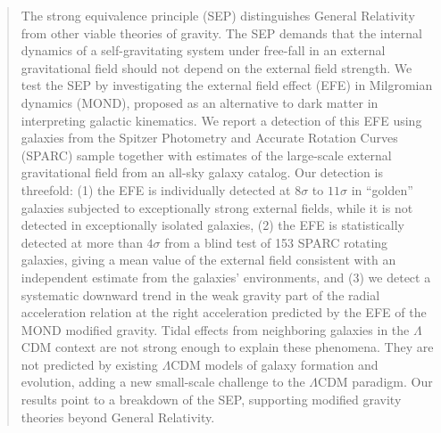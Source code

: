 \documentclass[twocolumn,tighten]{aastex63}
\begin{document}
\begin{abstract}
  The strong equivalence principle (SEP) distinguishes General Relativity from other viable theories of gravity. The SEP demands that the internal dynamics of a self-gravitating system under free-fall in an external gravitational field should not depend on the external field strength. We test the SEP by investigating the external field effect (EFE) in Milgromian dynamics (MOND), proposed as an alternative to dark matter in interpreting galactic kinematics. We report a detection of this EFE using galaxies from the Spitzer Photometry and Accurate Rotation Curves (SPARC) sample together with estimates of the large-scale external gravitational field from an all-sky galaxy catalog. Our detection is threefold: (1) the EFE is individually detected at $8\sigma$ to $11\sigma$ in ``golden'' galaxies subjected to exceptionally strong external fields, while it is not detected in exceptionally isolated galaxies, (2) the EFE is statistically detected at more than $4\sigma$ from a blind test of 153 SPARC rotating galaxies, giving a mean value of the external field consistent with an independent estimate from the galaxies' environments, and (3) we detect a systematic downward trend in the weak gravity part of the radial acceleration relation at the right acceleration predicted by the EFE of the MOND modified gravity. Tidal effects from neighboring galaxies in the $\Lambda$CDM context are not strong enough to explain these phenomena. They are not predicted by existing $\Lambda$CDM models of galaxy formation and evolution, adding a new small-scale challenge to the $\Lambda$CDM paradigm. Our results point to a breakdown of the SEP, supporting modified gravity theories beyond General Relativity.
\end{abstract}

\end{document}
